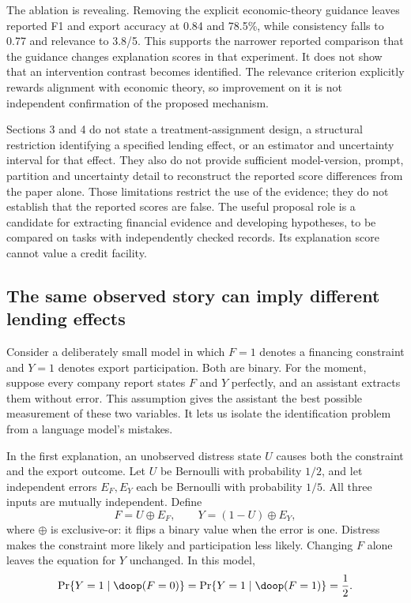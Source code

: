 The ablation is revealing. Removing the explicit economic-theory guidance
leaves reported F1 and export accuracy at 0.84 and 78.5\%, while consistency
falls to 0.77 and relevance to 3.8/5. This supports the narrower reported
comparison that the guidance changes explanation scores in that experiment.
It does not show that an intervention contrast becomes identified. The
relevance criterion explicitly rewards alignment with economic theory, so
improvement on it is not independent confirmation of the proposed mechanism.
\citep[Sections 4.2.2--4.6; Tables 1--2]{closure30li}

Sections 3 and 4 do not state a treatment-assignment design, a structural
restriction identifying a specified lending effect, or an estimator and
uncertainty interval for that effect. They also do not provide sufficient
model-version, prompt, partition and uncertainty detail to reconstruct the
reported score differences from the paper alone. Those limitations restrict
the use of the evidence; they do not establish that the reported scores are
false. The useful proposal role is a candidate for extracting financial
evidence and developing hypotheses, to be compared on tasks with independently
checked records. Its explanation score cannot value a credit facility.

\subsection{The same observed story can imply different lending effects}

Consider a deliberately small model in which $F=1$ denotes a financing
constraint and $Y=1$ denotes export participation. Both are binary. For the
moment, suppose every company report states $F$ and $Y$ perfectly, and an
assistant extracts them without error. This assumption gives the assistant
the best possible measurement of these two variables. It lets us isolate the
identification problem from a language model's mistakes.

In the first explanation, an unobserved distress state $U$ causes both the
constraint and the export outcome. Let $U$ be Bernoulli with probability
$1/2$, and let independent errors $E_F,E_Y$ each be Bernoulli with probability
$1/5$. All three inputs are mutually independent. Define
\begin{equation}
 F=U\mathbin{\oplus}E_F,\qquad
 Y=(1-U)\mathbin{\oplus}E_Y,
 \label{closure30:confounded}
\end{equation}
where $\oplus$ is exclusive-or: it flips a binary value when the error is one.
Distress makes the constraint more likely and participation less likely.
Changing $F$ alone leaves the equation for $Y$ unchanged. In this model,
\begin{equation}
 \Pr\{Y=1\mid\doop(F=0)\}
 =\Pr\{Y=1\mid\doop(F=1)\}=\frac12.
 \label{closure30:noeffect}
\end{equation}

